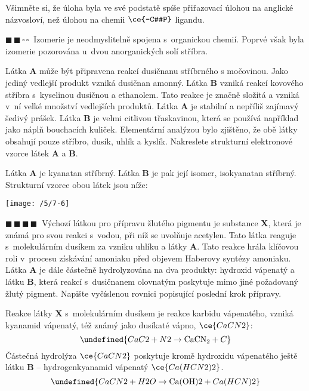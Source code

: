 \documentclass{book}
\let\ch\undefined
\newcommand{\dva}{$\blacksquare \, \blacksquare \, \square \, \square \; \; $}
\newcommand{\ctyri}{$\blacksquare \, \blacksquare \, \blacksquare \, \blacksquare \; \; $}
\renewenvironment{quotation}{\par}{\par} %
\begin{document}
Všimněte si, že úloha byla ve své podstatě spíše přiřazovací úlohou na anglické
názvosloví, než úlohou na chemii $\ce{-C#P}$ ligandu.

\hrulefill %
\begin{quotation}
\dva Izomerie je neodmyslitelně spojena s~organickou chemií. Poprvé však
byla izomerie pozorována u~dvou anorganických solí stříbra.

Látka \textbf{A} může být připravena reakcí dusičnanu stříbrného s
močovinou. Jako jediný vedlejší produkt vzniká dusičnan amonný. Látka
\textbf{B} vzniká reakcí kovového stříbra s~kyselinou dusičnou a
ethanolem. Tato reakce je značně složitá a vzniká v~ní velké množství
vedlejších produktů. Látka \textbf{A} je stabilní a nepříliš zajímavý
šedivý prášek. Látka \textbf{B} je velmi citlivou třaskavinou, která
se používá například jako náplň bouchacích kuliček. Elementární analýzou
bylo zjištěno, že obě látky obsahují pouze stříbro, dusík, uhlík a
kyslík. Nakreslete strukturní elektronové vzorce látek \textbf{A}
a \textbf{B}.
\end{quotation} \dotfill \par 

Látka \textbf{A} je kyanatan stříbrný. Látka \textbf{B} je pak její isomer, isokyanatan stříbrný. Strukturní vzorce obou látek jsou níže:
\begin{center}
\texttt{[image: /5/7-6]}
\par\end{center}

\hrulefill %
\begin{quotation}
\ctyri Výchozí látkou pro přípravu žlutého pigmentu je substance \textbf{X}, která je známá pro svou reakci s~vodou, při níž se uvolňuje acetylen.
Tato látka reaguje s~molekulárním dusíkem za vzniku uhlíku a látky
\textbf{A}. Tato reakce hrála klíčovou roli v~procesu získávání amoniaku
před objevem Haberovy syntézy amoniaku. Látka \textbf{A} je dále částečně
hydrolyzována na dva produkty: hydroxid vápenatý a látku \textbf{B},
která reakcí s~dusičnanem olovnatým poskytuje mimo jiné požadovaný
žlutý pigment. Napište vyčíslenou rovnici popisující poslední krok
přípravy.
\end{quotation} \dotfill \par 
Reakce látky \textbf{X} s~molekulárním dusíkem je reakce karbidu vápenatého,
vzniká kyanamid vápenatý, též známý jako dusíkaté vápno,  $\ce{CaCN2}$:
\[
\ch{CaC2 + N2 \rightarrow \mathrm{CaCN_2 } + C }
\]
Částečná hydrolýza $\ce{CaCN2}$ poskytuje
kromě hydroxidu vápenatého ještě látku \textbf{B} -- hydrogenkyanamid vápenatý $\ce{Ca(HCN2)2}$.
\[
\ch{CaCN2 + H2O \rightarrow \mathrm{Ca(OH)2} + Ca(HCN)2}
\]
\end{document}
